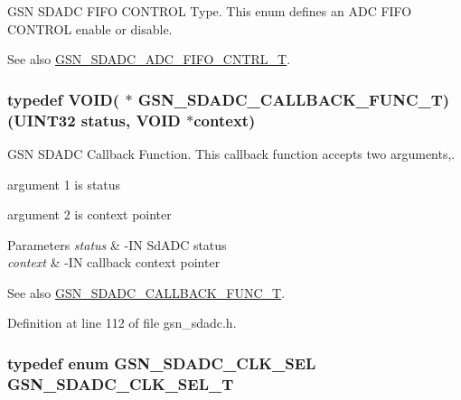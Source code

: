 GSN SDADC FIFO CONTROL Type. This enum defines an ADC FIFO CONTROL enable or disable. 

\begin{DoxySeeAlso}{See also}
\hyperlink{a00652_gaf55aace91b55b8544afeb27482cc70d4}{GSN\_\-SDADC\_\-ADC\_\-FIFO\_\-CNTRL\_\-T}. 
\end{DoxySeeAlso}
\hypertarget{a00652_ga1c7f85dc49dcc4b6c2fd8ee23dddfce6}{
\subsubsection[{GSN\_\-SDADC\_\-CALLBACK\_\-FUNC\_\-T}]{\setlength{\rightskip}{0pt plus 5cm}typedef VOID( $\ast$ {\bf GSN\_\-SDADC\_\-CALLBACK\_\-FUNC\_\-T})({\bf UINT32} status, VOID $\ast$context)}}
\label{a00652_ga1c7f85dc49dcc4b6c2fd8ee23dddfce6}


GSN SDADC Callback Function. This callback function accepts two arguments,. 


\begin{DoxyItemize}
\item argument 1 is status
\item argument 2 is context pointer
\end{DoxyItemize}


\begin{DoxyParams}{Parameters}
{\em status} & -\/IN SdADC status \\
\hline
{\em context} & -\/IN callback context pointer \\
\hline
\end{DoxyParams}
\begin{DoxySeeAlso}{See also}
\hyperlink{a00652_ga1c7f85dc49dcc4b6c2fd8ee23dddfce6}{GSN\_\-SDADC\_\-CALLBACK\_\-FUNC\_\-T}. 
\end{DoxySeeAlso}


Definition at line 112 of file gsn\_\-sdadc.h.

\hypertarget{a00652_ga3e84e460cc728aac5ff89621cc0ede91}{
\subsubsection[{GSN\_\-SDADC\_\-CLK\_\-SEL\_\-T}]{\setlength{\rightskip}{0pt plus 5cm}typedef enum {\bf GSN\_\-SDADC\_\-CLK\_\-SEL}  {\bf GSN\_\-SDADC\_\-CLK\_\-SEL\_\-T}}}
\label{a00652_ga3e84e460cc728aac5ff89621cc0ede91}


